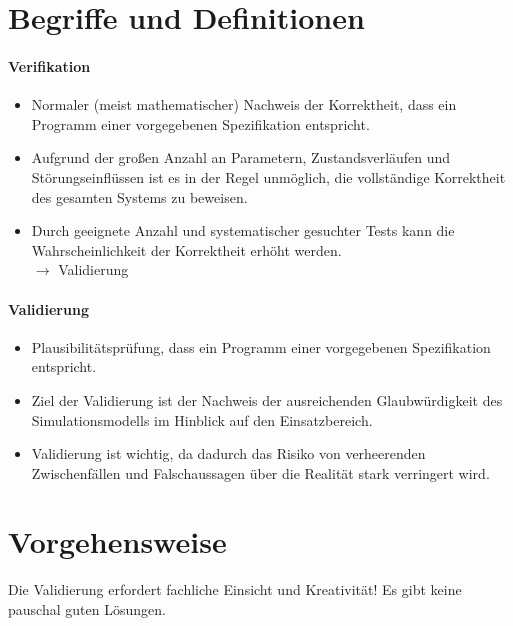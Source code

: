 \documentclass[a4paper, 11pt, accentcolor = tud3b]{tudreport}
\begin{document}
        \section{Begriffe und Definitionen} %
	        \paragraph{Verifikation}
		        \begin{itemize}
		        	\item Normaler (meist mathematischer) Nachweis der Korrektheit, dass ein Programm einer vorgegebenen Spezifikation entspricht.
		        	\item Aufgrund der großen Anzahl an Parametern, Zustandsverläufen und Störungseinflüssen ist es in der Regel unmöglich, die vollständige Korrektheit des gesamten Systems zu beweisen.
		        	\item Durch geeignete Anzahl und systematischer gesuchter Tests kann die Wahrscheinlichkeit der Korrektheit erhöht werden. \\ \( \rightarrow \) Validierung
		        \end{itemize}
	        
	        \paragraph{Validierung}
		        \begin{itemize}
		        	\item Plausibilitätsprüfung, dass ein Programm einer vorgegebenen Spezifikation entspricht.
		        	\item Ziel der Validierung ist der Nachweis der ausreichenden Glaubwürdigkeit des Simulationsmodells im Hinblick auf den Einsatzbereich.
		        	\item Validierung ist wichtig, da dadurch das Risiko von verheerenden Zwischenfällen und Falschaussagen über die Realität stark verringert wird.
	        	\end{itemize}

        \section{Vorgehensweise} %
            Die Validierung erfordert fachliche Einsicht und Kreativität! Es gibt keine pauschal guten Lösungen.
\end{document}
